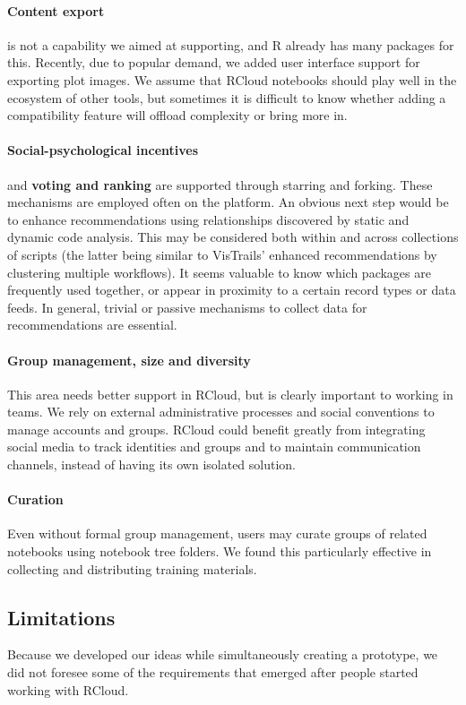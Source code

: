 \paragraph*{Content export} is not a capability we aimed at supporting,
and R already has many packages for this. Recently, due to popular
demand, we added user interface support for exporting plot images.
We assume that RCloud notebooks should play well in the ecosystem
of other tools, but sometimes it is difficult to know whether adding
a compatibility feature will offload complexity or bring more in.

\paragraph*{Social-psychological incentives} and {\bf voting and ranking} are
supported through starring and forking. These mechanisms are employed often
on the platform. An obvious next step would be to enhance recommendations
using relationships discovered by static and dynamic code analysis. This
may be considered both within and across collections of scripts (the latter
being similar to VisTrails' enhanced recommendations by clustering multiple
workflows).  It seems valuable to know which packages are frequently used
together, or appear in proximity to a certain record types or data feeds.
In general, trivial or passive mechanisms to collect data for
recommendations are essential.

\paragraph*{Group management, size and diversity} This area needs better
support in RCloud, but is clearly important to working in teams.
We rely on external administrative processes and social conventions
to manage accounts and groups. RCloud could benefit greatly from
integrating social media to track identities and groups and to maintain
communication channels, instead of having its own isolated solution.

\paragraph*{Curation} Even without formal group management, users may
curate groups of related notebooks using notebook tree folders.
We found this particularly effective in collecting and distributing
training materials.

\subsection{Limitations}
Because we developed our ideas while simultaneously creating a prototype,
we did not foresee some of the requirements that emerged after
people started working with RCloud.

